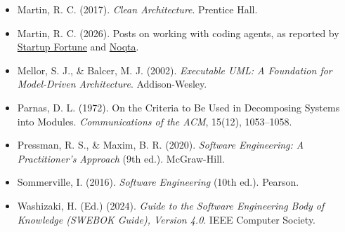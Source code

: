 \documentclass[11pt]{article}
\begin{document}
\begin{itemize}[leftmargin=*]
  \item Martin, R. C. (2017). \emph{Clean Architecture}. Prentice Hall.
  \item Martin, R. C. (2026). Posts on working with coding agents, as reported by \href{https://startupfortune.com/?p=16790}{Startup Fortune} and \href{https://noqta.tn/en/blog/disciplined-agentic-engineering-uncle-bob-tdd-ai-2026}{Noqta}.
  \item Mellor, S. J., \& Balcer, M. J. (2002). \emph{Executable UML: A Foundation for Model-Driven Architecture}. Addison-Wesley.
  \item Parnas, D. L. (1972). On the Criteria to Be Used in Decomposing Systems into Modules. \emph{Communications of the ACM}, 15(12), 1053--1058.
  \item Pressman, R. S., \& Maxim, B. R. (2020). \emph{Software Engineering: A Practitioner's Approach} (9th ed.). McGraw-Hill.
  \item Sommerville, I. (2016). \emph{Software Engineering} (10th ed.). Pearson.
  \item Washizaki, H. (Ed.) (2024). \emph{Guide to the Software Engineering Body of Knowledge (SWEBOK Guide), Version 4.0}. IEEE Computer Society.
\end{itemize}
\end{document}
